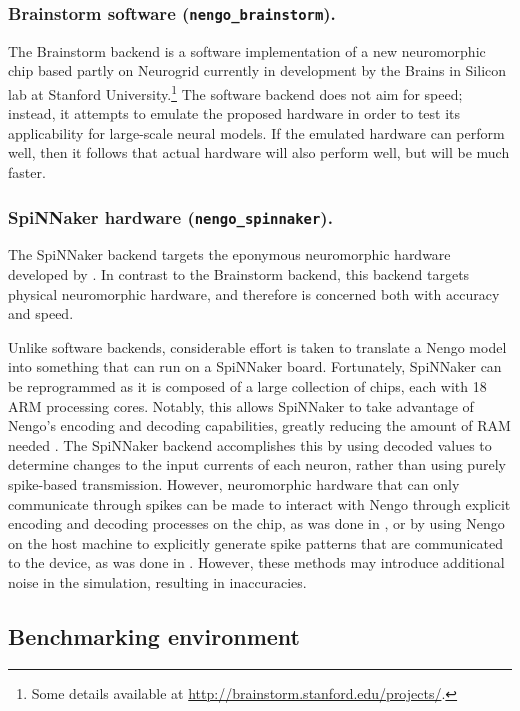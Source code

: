 \documentclass{frontiersSCNS}
\begin{document}
\subsubsection{Brainstorm software (\texttt{nengo\_brainstorm}).}

The Brainstorm backend is a software implementation
of a new neuromorphic chip
based partly on Neurogrid \citep{benjamin2014}
currently in development
by the Brains in Silicon lab
at Stanford University.\footnote{
  Some details available at \url{http://brainstorm.stanford.edu/projects/}.}
The software backend does not aim for speed;
instead, it attempts to emulate the proposed hardware
in order to test its applicability
for large-scale neural models.
If the emulated hardware can perform well,
then it follows that actual hardware
will also perform well,
but will be much faster.

\subsubsection{SpiNNaker hardware (\texttt{nengo\_spinnaker}).}

The SpiNNaker backend \citep{mundy2015}
targets the eponymous neuromorphic hardware
developed by \citet{furber2014}.
In contrast to the Brainstorm backend,
this backend targets physical neuromorphic hardware,
and therefore is concerned
both with accuracy and speed.

Unlike software backends,
considerable effort is taken
to translate a Nengo model into
something that can run on a SpiNNaker board.
Fortunately, SpiNNaker can be reprogrammed
as it is composed of a large collection
of chips, each with 18 ARM processing cores.
Notably, this allows SpiNNaker
to take advantage of Nengo's
encoding and decoding capabilities,
greatly reducing the amount of RAM needed
\citep{mundy2015}.
The SpiNNaker backend accomplishes this
by using decoded values to determine
changes to the input currents of each neuron,
rather than using purely
spike-based transmission.
However, neuromorphic hardware that
can only communicate through spikes
can be made to interact with Nengo
through explicit encoding and decoding processes
on the chip, as was done in \citet{galluppi2012},
or by using Nengo on the host machine
to explicitly generate spike patterns
that are communicated to the device,
as was done in \citet{choudhary2012}.
However, these methods may introduce
additional noise in the simulation,
resulting in inaccuracies.

\subsection{Benchmarking environment}
\end{document}
